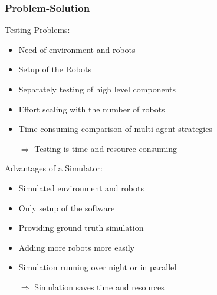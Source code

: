 \documentclass{beamer}
\begin{document}
\begin{frame}
\frametitle{Problem-Solution}
\begin{multicols}{2}
Testing Problems:
\begin{itemize}
\item Need of environment and robots
\item Setup of the Robots
\item Separately testing of high level components
\item Effort scaling with the number of robots
\item Time-consuming comparison of multi-agent strategies 
\item[$\Rightarrow$] Testing is time and resource consuming
\end{itemize}
Advantages of a Simulator:
\begin{itemize}
\item Simulated environment and robots
\item Only setup of the software
\item Providing ground truth simulation
\item Adding more robots more easily
\item Simulation running over night or in parallel
\item[$\Rightarrow$] Simulation saves time and resources
\end{itemize}
\end{multicols}
\end{frame}
\end{document}
